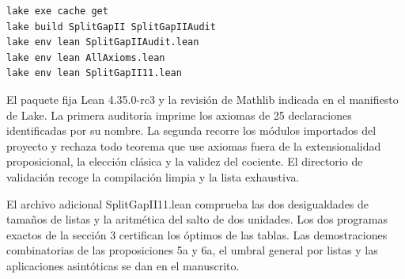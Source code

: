 \documentclass[spanish,10pt,a4paper]{article}
\begin{document}
\begin{verbatim}
lake exe cache get
lake build SplitGapII SplitGapIIAudit
lake env lean SplitGapIIAudit.lean
lake env lean AllAxioms.lean
lake env lean SplitGapII11.lean
\end{verbatim}

El paquete fija Lean 4.35.0-rc3 y la revisión de Mathlib indicada en el manifiesto de Lake. La primera auditoría imprime los axiomas de 25 declaraciones identificadas por su nombre. La segunda recorre los módulos importados del proyecto y rechaza todo teorema que use axiomas fuera de la extensionalidad proposicional, la elección clásica y la validez del cociente. El directorio de validación recoge la compilación limpia y la lista exhaustiva.

El archivo adicional SplitGapII11.lean comprueba las dos desigualdades de tamaños de listas y la aritmética del salto de dos unidades. Los dos programas exactos de la sección 3 certifican los óptimos de las tablas. Las demostraciones combinatorias de las proposiciones 5a y 6a, el umbral general por listas y las aplicaciones asintóticas se dan en el manuscrito.
\end{document}
